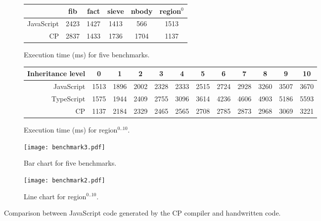 \begin{figure}[t]
\begin{subfigure}{\textwidth}
\centering
\footnotesize
\begin{tabular}{r*{5}{c}}
& \sffamily fib & \sffamily fact & \sffamily sieve & \sffamily nbody & \sffamily region$^0$ \\
\toprule
\sffamily JavaScript & 2423 & 1427 & 1413 &  566 & 1513 \\
\sffamily CP         & 2837 & 1433 & 1736 & 1704 & 1137 \\
\bottomrule
\end{tabular}
\caption{Execution time (ms) for five benchmarks.} \label{tab:benchmark3}
\end{subfigure}
\begin{subfigure}{\textwidth}
\centering
\footnotesize
\bigskip
\begin{tabular}{r*{11}{c}}
Inheritance level & 0 & 1 & 2 & 3 & 4 & 5 & 6 & 7 & 8 & 9 & 10 \\
\toprule
\sffamily JavaScript & 1513 & 1896 & 2002 & 2328 & 2333 & 2515 & 2724 & 2928 & 3260 & 3507 & 3670 \\
\sffamily TypeScript & 1575 & 1944 & 2409 & 2755 & 3096 & 3614 & 4236 & 4606 & 4903 & 5186 & 5593 \\
\sffamily CP         & 1137 & 2184 & 2329 & 2465 & 2565 & 2708 & 2785 & 2873 & 2968 & 3069 & 3221 \\
\bottomrule
\end{tabular}
\caption{Execution time (ms) for \textsf{region}$^{0..10}$.} \label{tab:benchmark2}
\end{subfigure}
\begin{subfigure}{.5\textwidth}
\centering
\texttt{[image: benchmark3.pdf]}
\caption{Bar chart for five benchmarks.}  \label{fig:benchmark3}
\end{subfigure}%
\begin{subfigure}{.5\textwidth}
\centering
\texttt{[image: benchmark2.pdf]}
\caption{Line chart for \textsf{region}$^{0..10}$.}  \label{fig:benchmark2}
\end{subfigure}
\caption{Comparison between JavaScript code generated by the CP compiler and handwritten code.}
\end{figure}

